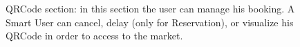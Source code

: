 \begin{figure}[H]


\caption{
        QRCode section: in this section the user can manage his booking. A Smart User can cancel, delay (only for Reservation), or visualize his QRCode in order to access to the market.
     }
     \begin{center}
%
\end{center}
\end{figure}
